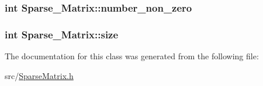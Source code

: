 \subsubsection[{number\+\_\+non\+\_\+zero}]{\setlength{\rightskip}{0pt plus 5cm}int Sparse\+\_\+\+Matrix\+::number\+\_\+non\+\_\+zero\hspace{0.3cm}{\ttfamily [private]}}\label{class_sparse___matrix_a279885c2e74db32d7f0e89809041b78e}
\hypertarget{class_sparse___matrix_a0593a57ade44950748c5c9cb5d9d19d6}{}
\subsubsection[{size}]{\setlength{\rightskip}{0pt plus 5cm}int Sparse\+\_\+\+Matrix\+::size\hspace{0.3cm}{\ttfamily [private]}}\label{class_sparse___matrix_a0593a57ade44950748c5c9cb5d9d19d6}


The documentation for this class was generated from the following file\+:\begin{DoxyCompactItemize}
\item 
src/\hyperlink{_sparse_matrix_8h}{Sparse\+Matrix.\+h}\end{DoxyCompactItemize}
